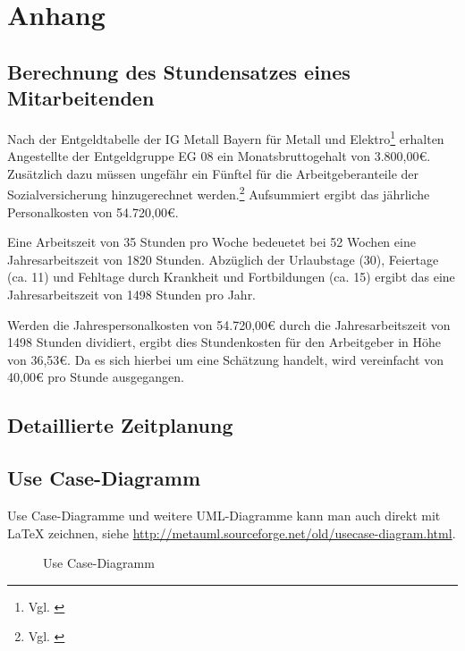 \section{Anhang}

\subsection{Berechnung des Stundensatzes eines Mitarbeitenden}
\label{app:Stundensatz}
Nach der Entgeldtabelle der IG Metall Bayern für Metall und Elektro\footnote{Vgl. \cite{Entgeldtabelle}} erhalten Angestellte der Entgeldgruppe EG 08 ein Monatsbruttogehalt von 3.800,00€. Zusätzlich dazu müssen ungefähr ein Fünftel für die Arbeitgeberanteile der Sozialversicherung hinzugerechnet werden.\footnote{Vgl. \cite{Personalkosten}} Aufsummiert ergibt das jährliche Personalkosten von 54.720,00€.

Eine Arbeitszeit von 35 Stunden pro Woche bedeuetet bei 52 Wochen eine Jahresarbeitszeit von 1820 Stunden. Abzüglich der Urlaubstage (30), Feiertage (ca. 11) und Fehltage durch Krankheit und Fortbildungen (ca. 15) ergibt das eine Jahresarbeitszeit von 1498 Stunden pro Jahr.

Werden die Jahrespersonalkosten von 54.720,00€ durch die Jahresarbeitszeit von 1498 Stunden dividiert, ergibt dies Stundenkosten für den Arbeitgeber in Höhe von 36,53€. Da es sich hierbei um eine Schätzung handelt, wird vereinfacht von 40,00€ pro Stunde ausgegangen.  



\subsection{Detaillierte Zeitplanung}
\label{app:Zeitplanung}



\clearpage

\subsection{Use Case-Diagramm}
\label{app:UseCase}
Use Case-Diagramme und weitere \acs{UML}-Diagramme kann man auch direkt mit \LaTeX{} zeichnen, siehe \zB \url{http://metauml.sourceforge.net/old/usecase-diagram.html}.
\begin{figure}[htb]
\centering
{}
\caption{Use Case-Diagramm}
\end{figure}

